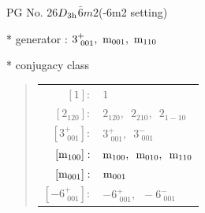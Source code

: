 \documentclass[fleqn,8pt]{jsarticle}
\begin{document}
\setcounter{MaxMatrixCols}{32}

\renewcommand{\tablename}{Table~}
\renewcommand{\figurename}{Figure~}
\begin{center}
\LARGE
PG No. 26\quad$D_{\rm 3h}$\quad$\bar{6}m2$\quad(-6m2 setting)\quad[ hexagonal ]
\end{center}

* generator : $3^{+}_{\,\,001},\,\,{\rm m}_{001},\,\,{\rm m}_{110}$

* conjugacy class
\begin{quote}
\begin{tabular}{rl}
$ [1]: $ & $ 1 $ \\
$ [2{}_{120}]: $ & $ 2{}_{120},\,\,\,2{}_{210},\,\,\,2{}_{1-10} $ \\
$ [3^{+}_{\,\,001}]: $ & $ 3^{+}_{\,\,001},\,\,\,3^{-}_{\,\,001} $ \\
$ [{\rm m}_{100}]: $ & $ {\rm m}_{100},\,\,\,{\rm m}_{010},\,\,\,{\rm m}_{110} $ \\
$ [{\rm m}_{001}]: $ & $ {\rm m}_{001} $ \\
$ [-6^{+}_{\,\,001}]: $ & $ -6^{+}_{\,\,001},\,\,\,-6^{-}_{\,\,001} $
\end{tabular}
\end{quote}
\end{document}
